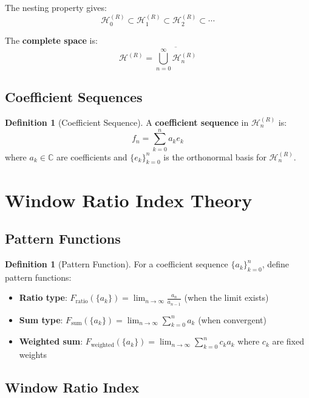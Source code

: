 \documentclass[12pt]{article}
\theoremstyle{plain}
\theoremstyle{definition}
\newtheorem{definition}[theorem]{Definition}
\begin{document}
The nesting property gives:
$$\mathcal{H}_0^{(R)} \subset \mathcal{H}_1^{(R)} \subset \mathcal{H}_2^{(R)} \subset \cdots$$

The \textbf{complete space} is:
$$\mathcal{H}^{(R)} = \overline{\bigcup_{n=0}^\infty \mathcal{H}_n^{(R)}}$$

\subsection{Coefficient Sequences}

\begin{definition}[Coefficient Sequence]
A \textbf{coefficient sequence} in $\mathcal{H}_n^{(R)}$ is:
$$f_n = \sum_{k=0}^n a_k e_k$$
where $a_k \in \mathbb{C}$ are coefficients and $\{e_k\}_{k=0}^n$ is the orthonormal basis for $\mathcal{H}_n^{(R)}$.
\end{definition}

\section{Window Ratio Index Theory}

\subsection{Pattern Functions}

\begin{definition}[Pattern Function]
For a coefficient sequence $\{a_k\}_{k=0}^n$, define pattern functions:

\begin{itemize}
\item \textbf{Ratio type}: $F_{\text{ratio}}(\{a_k\}) = \lim_{n \to \infty} \frac{a_n}{a_{n-1}}$ (when the limit exists)
\item \textbf{Sum type}: $F_{\text{sum}}(\{a_k\}) = \lim_{n \to \infty} \sum_{k=0}^n a_k$ (when convergent)
\item \textbf{Weighted sum}: $F_{\text{weighted}}(\{a_k\}) = \lim_{n \to \infty} \sum_{k=0}^n c_k a_k$ where $c_k$ are fixed weights
\end{itemize}
\end{definition}

\subsection{Window Ratio Index}
\end{document}
